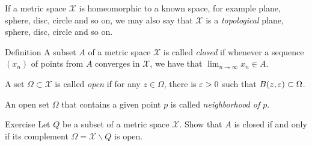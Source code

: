 If a metric space $\mathcal X$ is homeomorphic to a known space, for example plane, sphere, disc, circle and so on,
we may also say that $\mathcal X$ is a \emph{topological} plane, sphere, disc, circle and so on.

\begin{thm}{Definition}
A subset $A$ of a metric space $\mathcal{X}$ is called \emph{closed} if whenever a sequence $(x_n)$ of points from $A$ converges in $\mathcal{X}$, we have that $\lim_{n\to\infty} x_n \in A$.

A set $\Omega \subset \mathcal{X}$ is called \emph{open} if for any $z\in \Omega$, 
there is $\varepsilon>0$ such that $B(z,\varepsilon)\subset\Omega$.
\end{thm}

An open set $\Omega$ that contains a given point $p$ is called \emph{neighborhood of $p$}.

\begin{thm}{Exercise}
Let $Q$ be a subset of a metric space $\mathcal{X}$.
Show that $A$ is closed if and only if its complement $\Omega=\mathcal{X}\backslash Q$ is open.
\end{thm}
